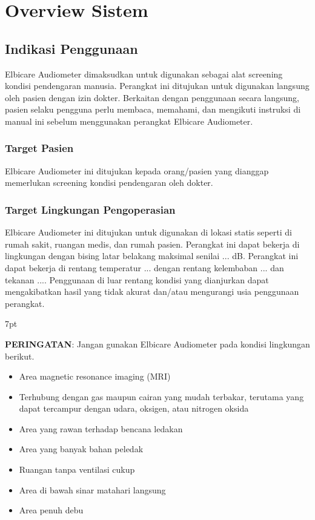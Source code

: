 \documentclass[11pt,a4paper,twoside,draft,onecolumn]{book}
\newenvironment{formalred}{%
	\def\FrameCommand{%
		\hspace{1pt}%
		{\color{red}\vrule width 2pt}%
		{\color{formalshade}\vrule width 4pt}%
		\colorbox{formalshade}%
	}%
	\MakeFramed{\advance\hsize-\width\FrameRestore}%
	\noindent\hspace{-4.55pt}%
	\begin{adjustwidth}{}{7pt}%
		\vspace{2pt}\vspace{2pt}%
	}
	{%
		\vspace{2pt}\end{adjustwidth}\endMakeFramed%
}
\begin{document}
	\chapter{Overview Sistem}
		\section{Indikasi Penggunaan}
		Elbicare Audiometer dimaksudkan untuk digunakan sebagai alat screening kondisi pendengaran manusia. Perangkat ini ditujukan untuk digunakan langsung oleh pasien dengan izin dokter. Berkaitan dengan penggunaan secara langsung, pasien selaku pengguna perlu membaca, memahami, dan mengikuti instruksi di manual ini sebelum menggunakan perangkat Elbicare Audiometer.
			\subsection{Target Pasien}
			Elbicare Audiometer ini ditujukan kepada orang/pasien yang dianggap memerlukan screening kondisi pendengaran oleh dokter.
			\subsection{Target Lingkungan Pengoperasian}
			Elbicare Audiometer ini ditujukan untuk digunakan di lokasi statis seperti di rumah sakit, ruangan medis, dan rumah pasien. Perangkat ini dapat bekerja di lingkungan dengan bising latar belakang maksimal senilai ... dB. Perangkat ini dapat bekerja di rentang temperatur ... dengan rentang kelembaban ... dan tekanan .... Penggunaan di luar rentang kondisi yang dianjurkan dapat mengakibatkan hasil yang tidak akurat dan/atau mengurangi usia penggunaan perangkat.
			
			\begin{formalred}
				\raisebox{0.125ex}{\resizebox{!}{2ex}{\danger}} \textbf{PERINGATAN}: 
				Jangan gunakan Elbicare Audiometer pada kondisi lingkungan berikut.
				\begin{itemize}
					\item Area magnetic resonance imaging (MRI)
					\item Terhubung dengan gas maupun cairan yang mudah terbakar, terutama yang dapat tercampur dengan udara, oksigen, atau nitrogen oksida
					\item Area yang rawan terhadap bencana ledakan
					\item Area yang banyak bahan peledak
					\item Ruangan tanpa ventilasi cukup
					\item Area di bawah sinar matahari langsung
					\item Area penuh debu
				\end{itemize}
				
			\end{formalred}
			
\end{document}
